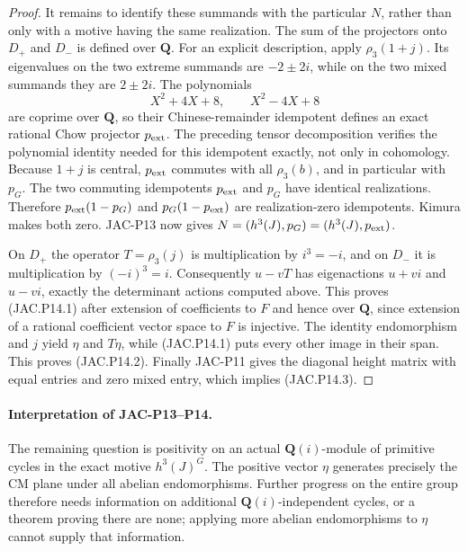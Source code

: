 \begin{proof}
It remains to identify these summands with the particular $N$,
rather than only with a motive having the same realization.
The sum of the projectors onto $D_+$ and $D_-$ is defined over
$\mathbf Q$. For an explicit description, apply $\rho_3(1+j)$.
Its eigenvalues on the two extreme summands are $-2\pm2i$,
while on the two mixed summands they are $2\pm2i$.
The polynomials
\[
 X^2+4X+8,\qquad X^2-4X+8
\]
are coprime over $\mathbf Q$, so their Chinese-remainder
idempotent defines an exact rational Chow projector $p_{\rm ext}$.
The preceding tensor decomposition verifies the polynomial
identity needed for this idempotent exactly, not only in cohomology.
Because $1+j$ is central, $p_{\rm ext}$ commutes with all
$\rho_3(b)$, and in particular with $p_G$.
The two commuting idempotents $p_{\rm ext}$ and $p_G$ have
identical realizations. Therefore
$p_{\rm ext}(1-p_G)$ and $p_G(1-p_{\rm ext})$ are
realization-zero idempotents. Kimura makes both zero.
JAC-P13 now gives $N=(h^3(J),p_G)=(h^3(J),p_{\rm ext})$.

On $D_+$ the operator $T=\rho_3(j)$ is multiplication by
$i^3=-i$, and on $D_-$ it is multiplication by $(-i)^3=i$.
Consequently $u-vT$ has eigenactions $u+vi$ and $u-vi$,
exactly the determinant actions computed above. This proves
(JAC.P14.1) after extension of coefficients to $F$ and hence over
$\mathbf Q$, since extension of a rational coefficient vector
space to $F$ is injective.
The identity endomorphism and $j$ yield $\eta$ and $T\eta$,
while (JAC.P14.1) puts every other image in their span.
This proves (JAC.P14.2). Finally JAC-P11 gives the diagonal
height matrix with equal entries and zero mixed entry, which
implies (JAC.P14.3).
\end{proof}

\paragraph{Interpretation of JAC-P13--P14.}
The remaining question is positivity on an actual
$\mathbf Q(i)$-module of primitive cycles in the exact motive
$h^3(J)^G$. The positive vector $\eta$ generates precisely the
CM plane under all abelian endomorphisms. Further progress on
the entire group therefore needs information on additional
$\mathbf Q(i)$-independent cycles, or a theorem proving there
are none; applying more abelian endomorphisms to $\eta$ cannot
supply that information.


